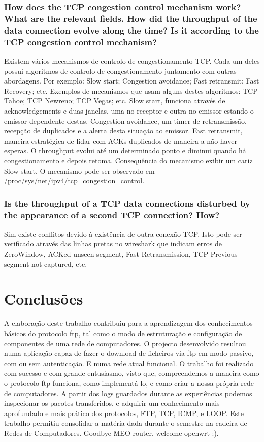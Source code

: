 \documentclass[a4paper]{article}
\begin{document}
\subsubsection{How does the TCP congestion control mechanism work? What are the
relevant fields. How did the throughput of the data connection evolve
along the time? Is it according to the TCP congestion control mechanism?}
Existem vários mecanismos de controlo de congestionamento TCP. Cada um deles possui algoritmos de controlo de congestionamento juntamento com outras abordagens. Por exemplo: Slow start; Congestion avoidance; Fast retransmit; Fast Recovery; etc. Exemplos de mecanismos que usam alguns destes algoritmos: TCP Tahoe; TCP Newreno; TCP Vegas; etc. Slow start, funciona através de acknowledgements e duas janelas, uma no receptor e outra no emissor estando o emissor dependente destas. Congestion avoidance, um timer de retransmissão, recepção de duplicados e a alerta desta situação ao emissor. Fast retransmit, maneira estratégica de lidar com ACKs duplicados de maneira a não haver esperas. O throughput evolui até um determinado ponto e diminui quando há congestionamento e depois retoma. Consequência do mecanismo exibir um cariz Slow start. O mecanismo pode ser observado em /proc/sys/net/ipv4/tcp\_congestion\_control.

\subsubsection{Is the throughput of a TCP data connections disturbed by the appearance of a second TCP connection? How?}
Sim existe conflitos devido à existência de outra conexão TCP. Isto pode ser verificado através das linhas pretas no wireshark que indicam erros de ZeroWindow, ACKed unseen segment, Fast Retransmission, TCP Previous segment not captured, etc.

\section{Conclusões}
A elaboração deste trabalho contribuiu para a aprendizagem dos conhecimentos
básicos do protocolo ftp, tal como o modo de estruturação e configuração de
componentes de uma rede de computadores. O projecto  desenvolvido resultou numa
aplicação capaz de fazer o download de ficheiros via ftp em modo passivo, com
ou sem autenticação. E numa rede atual funcional. O trabalho foi realizado com
sucesso e com grande entusiasmo, visto que, compreendemos a maneira como o
protocolo ftp funciona, como implementá-lo, e como criar a nossa própria rede de
computadores. A partir dos logs guardados durante as experiências podemos inspecionar
os pacotes transferidos, e adquirir um conhecimento mais aprofundado e mais prático dos protocolos,
FTP, TCP, ICMP, e LOOP. Este trabalho permitiu consolidar a matéria dada durante o semestre na cadeira
de Redes de Computadores. Goodbye MEO router, welcome openwrt :).
\end{document}
